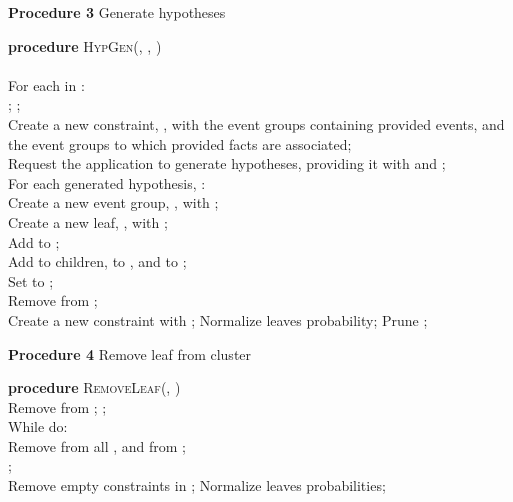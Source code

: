 \procedurespace
\begin{snippet}
\textbf{Procedure 3} Generate hypotheses\\ \hline

\textbf{procedure} \textsc{HypGen}(, , )\\
\\
For each  in :\\
\tab ; ;\\
\tab Create a new constraint, , with the event groups containing provided events, and the event groups to which provided facts are associated;\\
\tab Request the application to generate hypotheses, providing it with  and ;\\
\tab For each generated hypothesis, :\\
\tab \tab Create a new event group, , with ;\\
\tab \tab Create a new leaf, , with ;\\
\tab \tab Add  to ;\\
\tab \tab Add  to  children, to , and to ;\\
\tab \tab Set  to ;\\
\tab Remove  from ;\\
Create a new constraint with ; Normalize leaves probability; Prune ;\\
\end{snippet}

\procedurespace
\begin{snippet}
\textbf{Procedure 4} Remove leaf from cluster\\ \hline

\textbf{procedure} \textsc{RemoveLeaf}(, )\\
Remove  from ; ;\\
While  do:\\
\tab Remove  from all , and from ;\\
\tab ;\\
Remove empty constraints in ; Normalize leaves probabilities;\\
\end{snippet}

